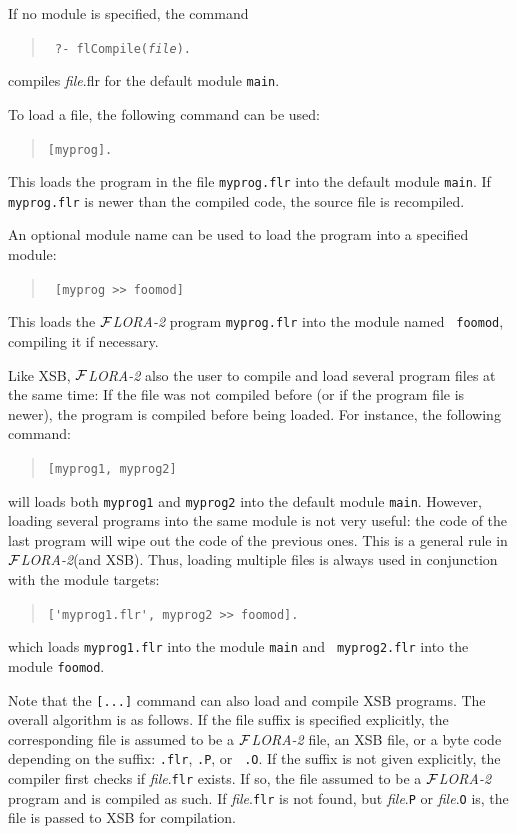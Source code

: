 \documentclass[11pt]{article}
\newcommand{\FLORA}{{\mbox{${\cal F}${\small\it LORA}\rm\emph{-2}}}\xspace}
\begin{document}
If no module is specified, the command
\begin{quote}
 \tt
 ?- flCompile({\it file}).
\end{quote}
compiles {\it file}.flr for the default module {\tt main}.


%
To load a file, the following command can be used:
\begin{quote}
 \tt [myprog].  
\end{quote}
This loads the program in the file {\tt myprog.flr} into the default module
{\tt main}. If {\tt myprog.flr} is newer than the compiled code, the source
file is recompiled.  

An optional module name can be used to load the program into a specified
module:
\begin{quote}
  \tt
[myprog >> foomod]
\end{quote}
This loads the \FLORA program {\tt myprog.flr} into the module named {\tt
  foomod}, compiling it if necessary.

Like XSB, \FLORA also the user to compile and load several program
files at the same time: If the file was not compiled before (or if the
program file is newer), the program is compiled before being loaded.  For
instance, the following command:
\begin{quote}
\verb|[myprog1, myprog2]|
\end{quote}
will loads both {\tt myprog1} and {\tt myprog2} into the default module
{\tt main}. However, loading several programs into the same module is not
very useful: the code of the last program will wipe out the code of the
previous ones. This is a general rule in \FLORA (and XSB). Thus, loading
multiple files is always used in conjunction with the module targets:
\begin{quote}
\verb|['myprog1.flr', myprog2 >> foomod].|
\end{quote}
which loads {\tt myprog1.flr} into the module {\tt main} and {\tt
  myprog2.flr} into the module {\tt foomod}.

Note that the {\tt [...]} command can also load and compile XSB programs.
The overall algorithm is as follows. If the file suffix is specified
explicitly, the corresponding file is assumed to be a \FLORA file, an XSB
file, or a byte code depending on the suffix: {\tt .flr}, {\tt .P}, or {\tt
  .O}. If the suffix is not given explicitly, the compiler first checks if
{\it file}.{\tt flr} exists. If so, the file assumed to be a \FLORA program
and is compiled as such. If {\it file}.{\tt flr} is not found, but {\it
  file}.{\tt P} or {\it file}.{\tt O} is, the file is passed to XSB for
compilation.
\end{document}
